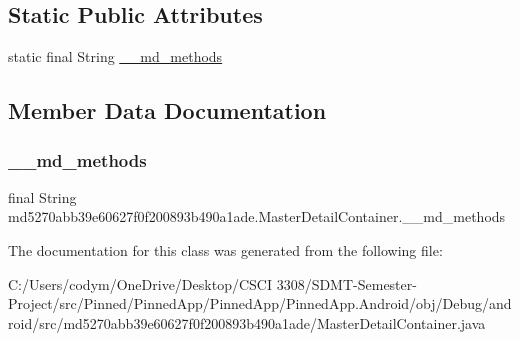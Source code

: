 \subsection*{Static Public Attributes}
\begin{DoxyCompactItemize}
\item 
static final String \hyperlink{classmd5270abb39e60627f0f200893b490a1ade_1_1_master_detail_container_ac82bf846b500c62b8736305937c47350}{\+\_\+\+\_\+md\+\_\+methods}
\end{DoxyCompactItemize}


\subsection{Member Data Documentation}
\mbox{\label{classmd5270abb39e60627f0f200893b490a1ade_1_1_master_detail_container_ac82bf846b500c62b8736305937c47350}} 
\subsubsection{\texorpdfstring{\+\_\+\+\_\+md\+\_\+methods}{\_\_md\_methods}}
{\footnotesize\ttfamily final String md5270abb39e60627f0f200893b490a1ade.\+Master\+Detail\+Container.\+\_\+\+\_\+md\+\_\+methods\hspace{0.3cm}{\ttfamily [static]}}



The documentation for this class was generated from the following file\+:\begin{DoxyCompactItemize}
\item 
C\+:/\+Users/codym/\+One\+Drive/\+Desktop/\+C\+S\+C\+I 3308/\+S\+D\+M\+T-\/\+Semester-\/\+Project/src/\+Pinned/\+Pinned\+App/\+Pinned\+App/\+Pinned\+App.\+Android/obj/\+Debug/android/src/md5270abb39e60627f0f200893b490a1ade/Master\+Detail\+Container.\+java\end{DoxyCompactItemize}
